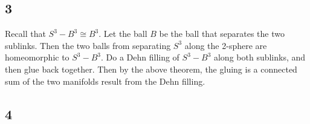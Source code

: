 \documentclass{article}
\theoremstyle{definition}
\numberwithin{theorem}{section}
\numberwithin{equation}{section}
\begin{document}
\subsection{3}
Recall that $S^3 - B^3 \cong B^3$. Let the ball $B$ be the ball that separates the two sublinks. Then the two balls from separating $S^3$ along the 2-sphere are homeomorphic to $S^3 - B^3$. Do a Dehn filling of $S^3 - B^3$ along both sublinks, and then glue back together. Then by the above theorem, the gluing is a connected sum of the two manifolds result from the Dehn filling. 

\subsection{4}
\end{document}
